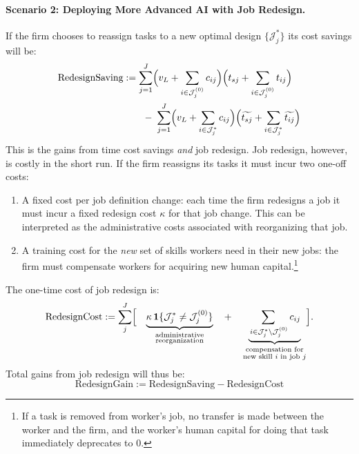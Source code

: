 \documentclass{article}
\theoremstyle{plain}
\theoremstyle{plain}
\begin{document}
\paragraph{Scenario 2: Deploying More Advanced AI with Job Redesign.}
If the firm chooses to reassign tasks to a new optimal design \(\{\mathcal{J}_j^*\}\) its cost savings will be:
\begin{align}
\label{eq:job_redesign_saving}
\text{RedesignSaving}
&:=
\sum_{j=1}^{J}
\Bigl(v_L + \sum_{i\in\mathcal{J}_j^{(0)}}c_{ij}\Bigr)
\Bigl(t_{sj} + \sum_{i\in\mathcal{J}_j^{(0)}}t_{ij}\Bigr)
\\
& \qquad
-\;
\sum_{j=1}^{J}
\Bigl(v_L + \sum_{i\in\mathcal{J}_j^*}c_{ij}\Bigr)
\Bigl(\widetilde{t_{sj}} + \sum_{i\in\mathcal{J}_j^*}\widetilde{t_{ij}}\Bigr) \nonumber
\end{align}
This is the gains from time cost savings \emph{and} job redesign.
Job redesign, however, is costly in the short run.
If the firm reassigns its tasks it must incur two one-off costs:
\begin{enumerate}
\item A fixed cost per job definition change: each time the firm redesigns a job it must incur a fixed redesign cost $\kappa$ for that job change.
This can be interpreted as the administrative costs associated with reorganizing that job.
\item A training cost for the \emph{new} set of skills workers need in their new jobs: the firm must compensate workers for acquiring new human capital.\footnote{If a task is removed from worker's job, no transfer is made between the worker and the firm, and the worker's human capital for doing that task immediately deprecates to 0.}
\end{enumerate}
The one-time cost of job redesign is:
\begin{equation}
\label{eq:job_redesign_cost}
\text{RedesignCost}
:=
\sum_{j}^{J}\Bigl[
\quad
\underbrace{\kappa\,\mathbf1\{\mathcal{J}_j^*\neq\mathcal{J}_j^{(0)}\}}_{\substack{\text{administrative}\\\text{reorganization}}}
\quad+\quad
\underbrace{\sum_{\,i\in\mathcal{J}_j^*\setminus\mathcal{J}_j^{(0)}}c_{ij}}_{\substack{\text{compensation for}\\\text{new skill $i$ in job $j$}}}
\Bigr].
\end{equation}
Total gains from job redesign will thus be:
\begin{equation}
\label{eq:job_redesign_gain}
\text{RedesignGain}
:=
\text{RedesignSaving} - \text{RedesignCost}
\end{equation}
\end{document}
